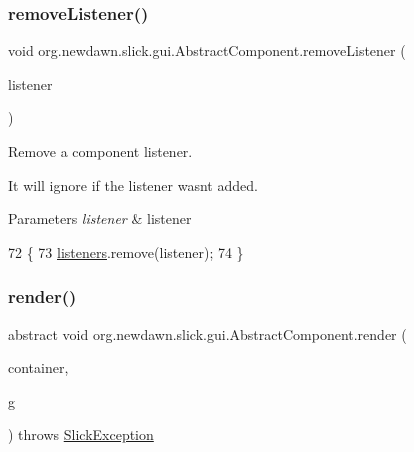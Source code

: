 \subsubsection{\texorpdfstring{remove\+Listener()}{removeListener()}}
{\footnotesize\ttfamily void org.\+newdawn.\+slick.\+gui.\+Abstract\+Component.\+remove\+Listener (\begin{DoxyParamCaption}\item[{\mbox{\hyperlink{interfaceorg_1_1newdawn_1_1slick_1_1gui_1_1_component_listener}{Component\+Listener}}}]{listener }\end{DoxyParamCaption})\hspace{0.3cm}{\ttfamily [inline]}}

Remove a component listener.

It will ignore if the listener wasn\textquotesingle{}t added.


\begin{DoxyParams}{Parameters}
{\em listener} & listener \\
\hline
\end{DoxyParams}

\begin{DoxyCode}
72                                                            \{
73         \mbox{\hyperlink{classorg_1_1newdawn_1_1slick_1_1gui_1_1_abstract_component_a7cec595b9b830ed15376739af35a1492}{listeners}}.remove(listener);
74     \}
\end{DoxyCode}
\mbox{\label{classorg_1_1newdawn_1_1slick_1_1gui_1_1_abstract_component_af2f66829fb28f1c9f27acfc6f1be2445}} 
\subsubsection{\texorpdfstring{render()}{render()}}
{\footnotesize\ttfamily abstract void org.\+newdawn.\+slick.\+gui.\+Abstract\+Component.\+render (\begin{DoxyParamCaption}\item[{\mbox{\hyperlink{interfaceorg_1_1newdawn_1_1slick_1_1gui_1_1_g_u_i_context}{G\+U\+I\+Context}}}]{container,  }\item[{\mbox{\hyperlink{classorg_1_1newdawn_1_1slick_1_1_graphics}{Graphics}}}]{g }\end{DoxyParamCaption}) throws \mbox{\hyperlink{classorg_1_1newdawn_1_1slick_1_1_slick_exception}{Slick\+Exception}}\hspace{0.3cm}{\ttfamily [abstract]}}

